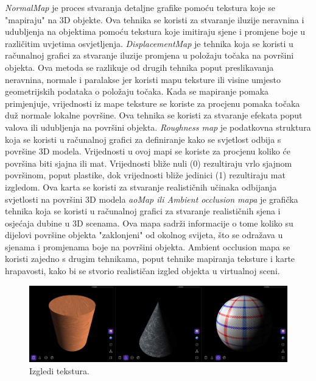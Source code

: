 \documentclass[a4paper,12pt]{article}
\begin{document}
\textit{NormalMap} je proces stvaranja detaljne grafike pomoću tekstura koje se "mapiraju" na 3D objekte. Ova tehnika se koristi za stvaranje iluzije neravnina i udubljenja na objektima pomoću tekstura koje imitiraju sjene i promjene boje u različitim uvjetima osvjetljenja.
\newline \textit{DisplacementMap} je tehnika koja se koristi u računalnoj grafici za stvaranje iluzije promjena u položaju točaka na površini objekta. Ova metoda se razlikuje od drugih tehnika poput preslikavanja neravnina, normale i paralakse jer koristi mapu teksture ili visine
umjesto geometrijskih podataka o položaju točaka. Kada se mapiranje pomaka primjenjuje, vrijednosti iz mape teksture se koriste za procjenu pomaka točaka duž normale lokalne površine. Ova tehnika se koristi za stvaranje efekata poput valova ili udubljenja na površini objekta.
\pagebreak
\textit{Roughness map} je podatkovna struktura koja se koristi u računalnoj grafici za definiranje kako se svjetlost odbija s površine 3D modela. Vrijednosti u ovoj mapi se koriste za procjenu koliko će površina biti sjajna ili mat. Vrijednosti bliže nuli (0) rezultiraju vrlo sjajnom površinom, 
poput plastike, dok vrijednosti bliže jedinici (1) rezultiraju mat izgledom. Ova karta se koristi za stvaranje realističnih učinaka odbijanja svjetlosti na površini 3D modela
\newline \textit{aoMap ili Ambient occlusion mapa} je grafička tehnika koja se koristi u računalnoj grafici za stvaranje realističnih sjena i osjećaja dubine u 3D scenama. Ova mapa sadrži informacije o tome koliko su dijelovi površine objekta "zaklonjeni" od okolnog svijeta, što se odražava u sjenama i promjenama boje na površini objekta. 
Ambient occlusion mapa se koristi zajedno s drugim tehnikama, poput tehnike mapiranja teksture i karte hrapavosti, kako bi se stvorio realističan izgled objekta u virtualnoj sceni.

\begin{figure}[ht]
    \centering
    \includegraphics[scale=0.3]{image/zadatak7_teksture.png}
    \caption{Izgledi tekstura.}
\end{figure}
\end{document}
